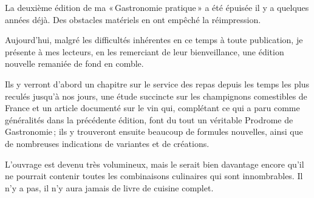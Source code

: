 La deuxième édition de ma « Gastronomie pratique » a été épuisée il y a
quelques années déjà. Des obstacles matériels en ont empêché la réimpression.

Aujourd'hui, malgré les difficultés inhérentes en ce temps à toute publication,
je présente à mes lecteurs, en les remerciant de leur bienveillance, une édition
nouvelle remaniée de fond en comble.

Ils y verront d'abord un chapitre sur le service des repas depuis les temps les
plus reculés jusqu'à nos jours, une étude succincte sur les champignons comestibles 
de France et un article documenté sur le vin qui, complétant ce qui a paru
comme généralités dans la précédente édition, font du tout un véritable Prodrome
de Gastronomie ; ils y trouveront ensuite beaucoup de formules nouvelles, ainsi
que de nombreuses indications de variantes et de créations.

L'ouvrage est devenu très volumineux, mais le serait bien davantage encore
qu'il ne pourrait contenir toutes les combinaisons culinaires qui sont
innombrables. Il n'y a pas, il n'y aura jamais de livre de cuisine complet.
